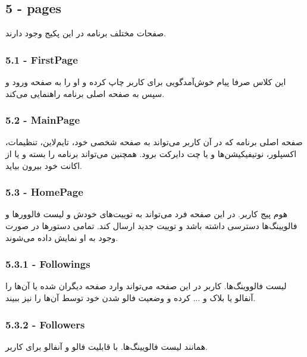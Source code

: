 \documentclass[12pt]{article}
\begin{document}
\LTR
\begin{latin}
\subsection*{5 - pages}
\end{latin}
\RTL
صفحات مختلف برنامه در این پکیج وجود دارند.

\LTR
\begin{latin}
\subsubsection*{5.1 - FirstPage}
\end{latin}
\RTL
این کلاس صرفا پیام خوش‌آمدگویی برای کاربر چاپ کرده و او را به صفحه ورود و سپس به صفحه اصلی برنامه راهنمایی می‌کند.

\LTR
\begin{latin}
\subsubsection*{5.2 - MainPage}
\end{latin}
\RTL
صفحه اصلی برنامه که در آن کاربر می‌تواند به صفحه شخصی خود، تایم‌لاین، تنظیمات، اکسپلور، نوتیفیکیشن‌ها و یا چت دایرکت برود. همچنین می‌تواند برنامه را بسته و یا از اکانت خود بیرون بیاید.

\LTR
\begin{latin}
\subsubsection*{5.3 - HomePage}
\end{latin}
\RTL
هوم پیج کاربر. در این صفحه فرد می‌تواند به توییت‌های خودش‌ و لیست فالوورها و فالویینگ‌ها دسترسی داشته باشد و توییت جدید ارسال کند. تمامی دستورها در صورت وجود به او نمایش داده می‌شوند.

\LTR
\begin{latin}
\subsubsection*{5.3.1 - Followings}
\end{latin}
\RTL
لیست فالووینگ‌ها. کاربر در این صفحه می‌تواند وارد صفحه دیگران شده یا آن‌ها را آنفالو یا بلاک و ... کرده و وضعیت فالو شدن خود توسط آن‌ها را نیز ببیند.

\LTR
\begin{latin}
\subsubsection*{5.3.2 - Followers}
\end{latin}
\RTL
همانند لیست فالویینگ‌ها. با قابلیت فالو و آنفالو برای کاربر.
\end{document}
